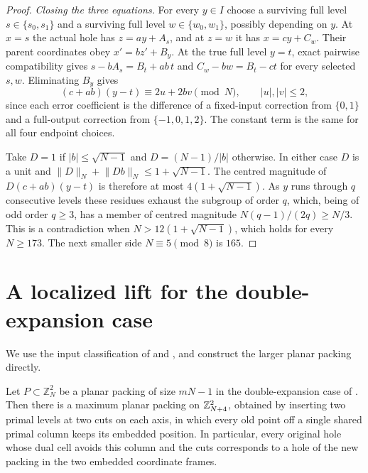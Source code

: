 \documentclass[11pt,colorlinks]{charlie}
\newcommand{\ZN}{\mathbb{Z}_N}
\newcommand{\norm}[1]{\lVert #1\rVert}
\begin{document}
\begin{proof}
\emph{Closing the three equations.} For every $y\in I$ choose a surviving full level $s\in\{s_0,s_1\}$ and a surviving full level $w\in\{w_0,w_1\}$, possibly depending on $y$. At $x=s$ the actual hole has $z=ay+A_s$, and at $z=w$ it has $x=cy+C_w$. Their parent coordinates obey $x'=bz'+B_y$. At the true full level $y=t$, exact pairwise compatibility gives $s-bA_s=B_t+ab\,t$ and $C_w-bw=B_t-ct$ for every selected $s,w$. Eliminating $B_y$ gives
\[
 (c+ab)(y-t)\equiv2u+2bv\pmod N,\qquad |u|,|v|\le2,
\]
since each error coefficient is the difference of a fixed-input correction from $\{0,1\}$ and a full-output correction from $\{-1,0,1,2\}$. The constant term is the same for all four endpoint choices.

Take $D=1$ if $|b|\le\sqrt{N-1}$ and $D=(N-1)/|b|$ otherwise. In either case $D$ is a unit and $\norm{D}_N+\norm{Db}_N\le1+\sqrt{N-1}$. The centred magnitude of $D(c+ab)(y-t)$ is therefore at most $4(1+\sqrt{N-1})$. As $y$ runs through $q$ consecutive levels these residues exhaust the subgroup of order $q$, which, being of odd order $q\ge3$, has a member of centred magnitude $N(q-1)/(2q)\ge N/3$. This is a contradiction when $N>12(1+\sqrt{N-1})$, which holds for every $N\ge173$. The next smaller side $N\equiv5\pmod8$ is $165$.
\end{proof}

\section{A localized lift for the double-expansion case}\label{sec:lift}

We use the input classification of \cite[Section~3.2.2, Case~2]{BHNlong} and \cite[Lemmas~12, 16 and~19]{BHNlong}, and construct the larger planar packing directly.

\begin{proposition}\label{prop:lift}
Let $P\subset\ZN^2$ be a planar packing of size $mN-1$ in the double-expansion case of . Then there is a maximum planar packing on $\mathbb{Z}_{N+4}^2$, obtained by inserting two primal levels at two cuts on each axis, in which every old point off a single shared primal column keeps its embedded position. In particular, every original hole whose dual cell avoids this column and the cuts corresponds to a hole of the new packing in the two embedded coordinate frames.
\end{proposition}
\end{document}

